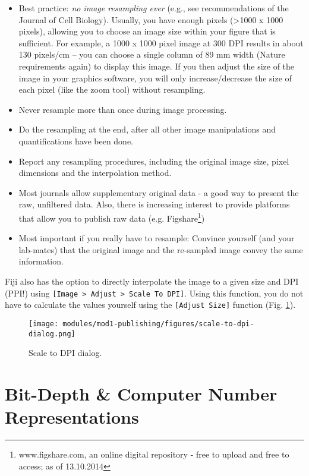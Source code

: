 \begin{itemize}
	\item Best practice: \emph{no image resampling ever} (e.g., see recommendations of the Journal of Cell Biology). Usually, you have enough pixels (>1000 x 1000 pixels), allowing you to choose an image size within your figure that is sufficient. For example, a 1000 x 1000 pixel image at 300 DPI results in about 130 pixels/cm -- you can choose a single column of 89 mm width (Nature requirements again) to display this image. If you then adjust the size of the image in your graphics software, you will only increase/decrease the size of each pixel (like the zoom tool) without resampling.
	\item Never resample more than once during image processing.
	\item Do the resampling at the end, after all other image manipulations and quantifications have been done.	
	\item Report any resampling procedures, including the original image size, pixel dimensions and the interpolation method.
	\item Most journals allow supplementary original data - a good way to present the raw, unfiltered data. Also, there is increasing interest to provide platforms that allow you to publish raw data (e.g. Figshare\footnote{www.figshare.com, an online digital repository - free to upload and free to access; as of 13.10.2014})
	\item Most important if you really have to resample: Convince yourself (and your lab-mates) that the original image and the re-sampled image convey the same information.
\end{itemize}

Fiji also has the option to directly interpolate the image to a given size and DPI (PPI!) using \texttt{[Image > Adjust > Scale To DPI]}. Using this function, you do not have to calculate the values yourself using the \texttt{[Adjust Size]} function (Fig. \ref{fig:scale-to-dpi-dialog}).
\begin{figure}[!h]
	\centering
		\texttt{[image: modules/mod1-publishing/figures/scale-to-dpi-dialog.png]}
	\caption{Scale to DPI dialog.}
	\label{fig:scale-to-dpi-dialog}
\end{figure}

\section{Bit-Depth \& Computer Number Representations}

